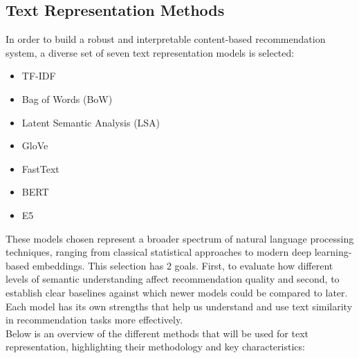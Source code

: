 \documentclass[\myFontSize,a4paper,oneside,hidelinks]{article}
\begin{document}
\subsection{Text Representation Methods}
In order to build a robust and interpretable content-based recommendation system, a diverse set of seven text representation models is selected: 
\begin{itemize}
\item TF-IDF
\item Bag of Words (BoW)
\item Latent Semantic Analysis (LSA)
\item GloVe
\item FastText
\item BERT
\item E5
\end{itemize}
%
These models chosen represent a broader spectrum of natural language processing techniques, ranging from classical statistical approaches to modern deep learning-based embeddings.
This selection has 2 goals. First, to evaluate how different levels of semantic understanding affect recommendation quality and second, to establish clear baselines against which newer models could be compared to later. Each model has its own strengths that help us understand and use text similarity in recommendation tasks more effectively.\\
%
%
Below is an overview of the different methods that will be used for text representation, highlighting their methodology and key characteristics:
\end{document}
